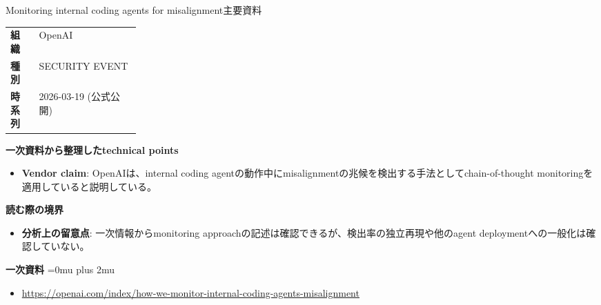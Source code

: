 \begin{technicalnote}{Monitoring internal coding agents for misalignment}{主要資料}
\begingroup
\begin{tabularx}{\linewidth}{@{}>{\bfseries}p{0.22\linewidth}X@{}}
組織 & OpenAI \\
種別 & SECURITY EVENT \\
時系列 & 2026-03-19 (公式公開) \\
\end{tabularx}
\smallskip
{\bfseries 一次資料から整理したtechnical points}
\begin{itemize}[leftmargin=1.5em,itemsep=0.35em]
\item \textbf{Vendor claim}: OpenAIは、internal coding agentの動作中にmisalignmentの兆候を検出する手法としてchain-of-thought monitoringを適用していると説明している。
\end{itemize}
\begin{minipage}{\linewidth}
{\bfseries 読む際の境界}
\begin{itemize}[leftmargin=1.5em,itemsep=0.35em]
\item \textbf{分析上の留意点}: 一次情報からmonitoring approachの記述は確認できるが、検出率の独立再現や他のagent deploymentへの一般化は確認していない。
\end{itemize}
\begin{samepage}
{\bfseries 一次資料}
\begingroup\sloppy
\Urlmuskip=0mu plus 2mu\relax
\begin{itemize}[leftmargin=1.5em,itemsep=0.25em]
\item {\scriptsize\url{https://openai.com/index/how-we-monitor-internal-coding-agents-misalignment}}
\end{itemize}
\endgroup
\end{samepage}
\end{minipage}
\endgroup
\end{technicalnote}
\medskip

